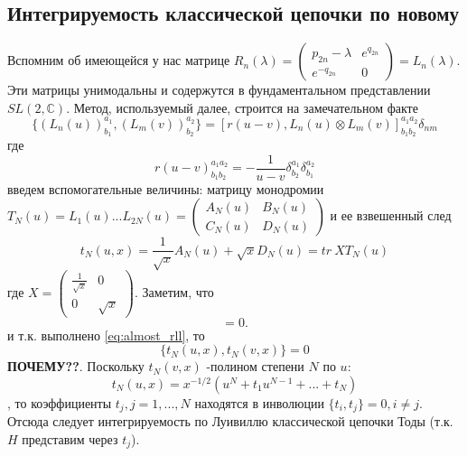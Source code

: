 \documentclass[12pt]{article}
\begin{document}
\subsection{Интегрируемость классической цепочки по новому}
Вспомним об имеющейся у нас матрице $R_n (\lambda) = 
\begin{pmatrix}
    p_{2n} - \lambda & e^{q_{2n}} \\
    e^{-q_{2n}} & 0
\end{pmatrix} = L_n (\lambda)$. Эти матрицы унимодальны и содержутся в фундаментальном представлении $SL(2, \mathbb{C})$.
Метод, используемый далее, строится на замечательном факте 
\begin{equation}\label{eq:almost_rll}
    \{ (L_n(u))^{a_1}_{b_1}, (L_m(v))^{a_2}_{b_2} \} = [r(u - v), L_n(u) \otimes L_m(v)]^{a_1 a_2}_{b_1 b_2} \delta_{nm}
\end{equation}
где 
\begin{equation}
    r(u-v)^{a_1 a_2}_{b_1 b_2} = - \frac{1}{u-v}\delta^{a_1}_{b_2} \delta^{a_2}_{b_1}
\end{equation}
введем вспомогательные величины: матрицу монодромии $T_N(u) = L_1(u) ... L_{2N}(u) = 
\begin{pmatrix}
    A_N(u) & B_N(u) \\
    C_N(u) & D_N(u)
\end{pmatrix}$
и ее взвешенный след 
\begin{equation}
    t_N(u, x) = \frac{1}{\sqrt{x}}A_N(u) + \sqrt{x} D_N(u) = tr \ X T_N(u)
\end{equation}
где $X = 
\begin{pmatrix}
    \frac{1}{\sqrt{x}} & 0 \\
    0 & \sqrt{x}
\end{pmatrix}$. Заметим, что 
\begin{equation}
    [r(u-v), X \otimes X] = 0.
\end{equation}
и т.к. выполнено \eqref{eq:almost_rll}, то 
\begin{equation}
    \{t_N(u, x), t_N(v, x) \} = 0
\end{equation}
\textbf{ПОЧЕМУ??}. Поскольку $t_N(v, x)$ -полином степени $N$ по $u$:
\begin{equation}
    t_N(u, x) = x^{-1/2}(u^N + t_1 u^{N-1} + ... + t_N)
\end{equation}
, то коэффициенты $t_j, j = 1, ..., N$ находятся в инволюции $\{t_i, t_j \} = 0, i \neq j$.
Отсюда следует интегрируемость по Луивиллю классической цепочки Тоды (т.к. $H$ представим через $t_j$).
\end{document}
